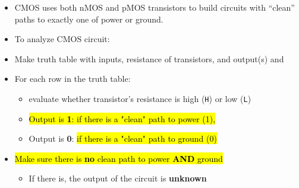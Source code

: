 \begin{frame}[fragile]
\begin{itemize}
	\item CMOS uses both nMOS and pMOS transistors to build circuits with ``clean'' paths to exactly one of power or ground.

  \item   To analyze CMOS circuit:\\
  \end{itemize}
  \begin{itemize}
    \item Make truth table with inputs, resistance of transistors, and output(s) and 
    \item For each row in the truth table:
        \begin{itemize}
            \item evaluate whether transistor's resistance is high (\texttt{H}) or low (\texttt{L})
            \item \hl{Output is \textbf{1}: if there is a "clean" path to power (1),} 
    \item  Output is \textbf{0}: \hl{if there is a "clean" path to ground (0) }

        \end{itemize}
    
    \item \hl{Make sure there is \textbf{no} clean path to power \textbf{AND} ground}
    \begin{itemize}
        \item If there is, the output of the circuit is \textbf{unknown} 
    \end{itemize}
\end{itemize}       
\end{frame}
\BNotes\ifnum{}
